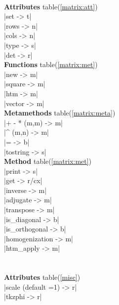 \documentclass[DIV         = 14,
               fontsize    = 10,
               index       = totoc,
               twoside,
               cadre,
               headings    = small
               ]{tkz-doc}
\begin{document}
\begin{multicols}{3}
             \\
\textbf{Attributes} table(\ref{matrix:att})   \\
|set                       ->  t|  \\
|rows                      ->  n|  \\
|cols                      ->  n|  \\
|type                      ->  s|  \\
|det                       ->  r|  \\
\textbf{Functions} table(\ref{matrix:met}) \\
|new                       ->  m|  \\
|square                    ->  m|  \\
|htm                       ->  m|  \\
|vector                    ->  m|  \\
\textbf{Metamethods} table(\ref{matrix:meta}) \\
|+ - *  (m,m)              -> m|   \\
|^ (m,n)                   -> m|   \\
|=                         -> b|   \\
|tostring                  -> s|   \\
\textbf{Method} table(\ref{matrix:met})   \\
|print                     -> s|   \\                              
|get                       -> r/cx|\\
|inverse                   -> m|   \\    
|adjugate                  -> m|   \\ 
|transpose                 -> m|   \\   
|is_diagonal               -> b|   \\   
|is_orthogonal             -> b|   \\  
|homogenization            -> m|   \\  
|htm_apply                 -> m|   \\  
                                   \\                                  
              \\
 \textbf{Attributes} table(\ref{misc}) \\
|scale (default =1)        -> r|   \\ 
|tkzphi                    -> r|   \\

\end{multicols}
\end{document}
